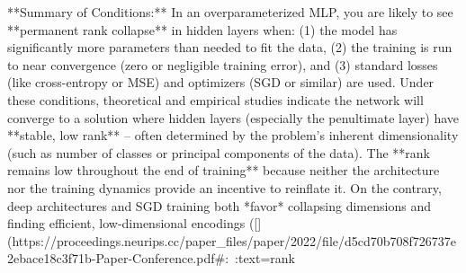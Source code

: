**Summary of Conditions:** In an overparameterized MLP, you are likely to see **permanent rank collapse** in hidden layers when: (1) the model has significantly more parameters than needed to fit the data, (2) the training is run to near convergence (zero or negligible training error), and (3) standard losses (like cross-entropy or MSE) and optimizers (SGD or similar) are used. Under these conditions, theoretical and empirical studies indicate the network will converge to a solution where hidden layers (especially the penultimate layer) have **stable, low rank** – often determined by the problem’s inherent dimensionality (such as number of classes or principal components of the data). The **rank remains low throughout the end of training** because neither the architecture nor the training dynamics provide an incentive to reinflate it. On the contrary, deep architectures and SGD training both *favor* collapsing dimensions and finding efficient, low-dimensional encodings ([](https://proceedings.neurips.cc/paper_files/paper/2022/file/d5cd70b708f726737e2ebace18c3f71b-Paper-Conference.pdf#:~:text=rank%

